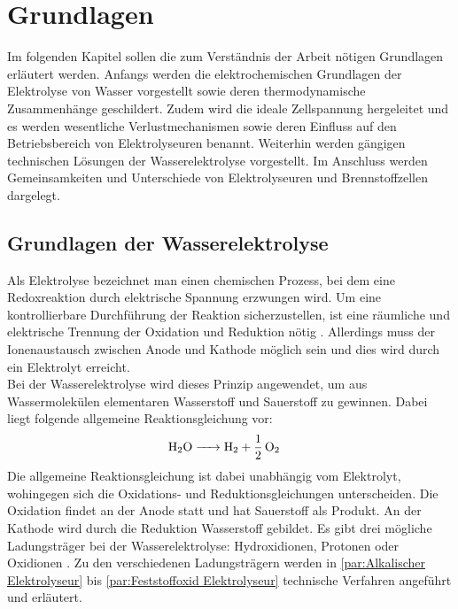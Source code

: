 \chapter{Grundlagen}
\label{cha:Grundlagen}
Im folgenden Kapitel sollen die zum Verständnis der Arbeit nötigen Grundlagen erläutert werden. Anfangs werden die elektrochemischen Grundlagen der Elektrolyse von Wasser vorgestellt sowie deren thermodynamische Zusammenhänge geschildert. Zudem wird die ideale Zellspannung hergeleitet und es werden wesentliche Verlustmechanismen sowie deren Einfluss auf den Betriebsbereich von Elektrolyseuren benannt. Weiterhin werden gängigen technischen Lösungen der Wasserelektrolyse vorgestellt. Im Anschluss werden Gemeinsamkeiten und Unterschiede von Elektrolyseuren und Brennstoffzellen dargelegt. \\


\section{Grundlagen der Wasserelektrolyse}
\label{sec:Elektrolyse}
Als Elektrolyse bezeichnet man einen chemischen Prozess, bei dem eine Redoxreaktion durch elektrische Spannung erzwungen wird. 
Um eine kontrollierbare Durchführung der Reaktion sicherzustellen, ist eine räumliche und elektrische Trennung der Oxidation und Reduktion nötig \citep{tjarks_pem-elektrolyse-systeme_2017}. Allerdings muss der Ionenaustausch zwischen Anode und Kathode möglich sein und dies wird durch ein Elektrolyt erreicht.\\

Bei der Wasserelektrolyse wird dieses Prinzip angewendet, um aus Wassermolekülen elementaren Wasserstoff und Sauerstoff zu gewinnen. Dabei liegt folgende allgemeine Reaktionsgleichung vor:   
\begin{align}
	\label{gl:Reaktionsgleichung}
	\ce{ H2O &-> H2 + 1/2O2}
\end{align}
Die allgemeine Reaktionsgleichung ist dabei unabhängig vom Elektrolyt, wohingegen sich die Oxidations- und Reduktionsgleichungen unterscheiden. Die Oxidation findet an der Anode statt und hat Sauerstoff als Produkt. An der Kathode wird durch die Reduktion Wasserstoff gebildet. Es gibt drei mögliche Ladungsträger bei der Wasserelektrolyse: Hydroxidionen, Protonen oder Oxidionen \citep{tjarks_pem-elektrolyse-systeme_2017}. Zu den verschiedenen Ladungsträgern werden in  \ref{par:Alkalischer Elektrolyseur} bis \ref{par:Feststoffoxid Elektrolyseur} technische Verfahren angeführt und erläutert.\\

